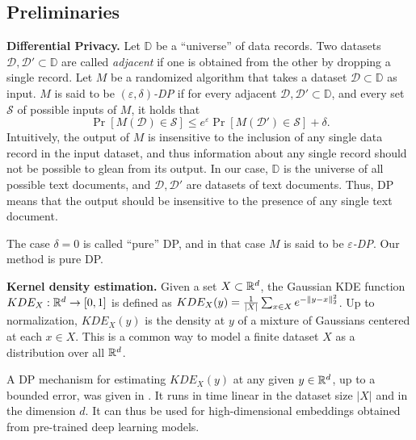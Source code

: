 \subsection{Preliminaries}\label{sec:prelim}

\noindent\textbf{Differential Privacy.}
Let $\mathbb D$ be a ``universe'' of data records. Two datasets $\mathcal{D},\mathcal{D'}\subset\mathbb D$ are called \emph{adjacent} if one is obtained from the other by dropping a single record. 
Let $M$ be a randomized algorithm that takes a dataset $\mathcal{D}\subset\mathbb D$ as input. $M$ is said to be \emph{$(\varepsilon,\delta)$-DP} if for every adjacent $\mathcal{D},\mathcal{D'}\subset\mathbb D$, and every set $\mathcal S$ of possible inputs of $M$, it holds that
\[ \Pr[M(\mathcal{D})\in \mathcal S] \leq e^\varepsilon \Pr[M(\mathcal{D'})\in \mathcal S] + \delta . \]
Intuitively, the output of $M$ is insensitive to the inclusion of any single data record in the input dataset, and thus information about any single record should not be possible to glean from its output. 
%
In our case, $\mathbb D$ is the universe of all possible text documents, and $\mathcal{D},\mathcal{D'}$ are datasets of text documents. Thus, DP means that the output should be insensitive to the presence of any single text document.

The case $\delta=0$ is called ``pure'' DP, and in that case $M$ is said to be \emph{$\varepsilon$-DP}. Our method is pure DP. 


\noindent\textbf{Kernel density estimation.}
Given a set $X\subset\mathbb R^d$, the Gaussian KDE function $KDE_X:\mathbb R^d\rightarrow[0,1]$ is defined as $KDE_X(y)=\tfrac{1}{|X|}\sum_{x\in X}e^{-\lVert y-x\rVert_2^2}$. Up to normalization, $KDE_X(y)$ is the density at $y$ of a mixture of Gaussians centered at each $x\in X$. This is a common way to model a finite dataset $X$ as a distribution over all $\mathbb R^d$. 

A DP mechanism for estimating $KDE_X(y)$ at any given $y\in\mathbb R^d$, up to a bounded error, was given in \cite{wagner2023fast}. It runs in time linear in the dataset size $|X|$ and in the dimension $d$. It can thus be used for high-dimensional embeddings obtained from pre-trained deep learning models.
